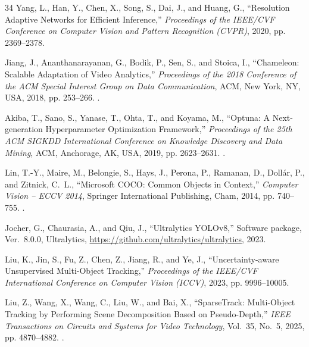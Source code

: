 \documentclass[journal]{new-aiaa}
\begin{document}
\begin{thebibliography}{34}
Yang, L., Han, Y., Chen, X., Song, S., Dai, J., and Huang, G.,
  \enquote{{Resolution Adaptive Networks for Efficient Inference},}
  \emph{Proceedings of the IEEE/CVF Conference on Computer Vision and Pattern
  Recognition (CVPR)}, 2020, pp. 2369--2378.

Jiang, J., Ananthanarayanan, G., Bodik, P., Sen, S., and Stoica, I.,
  \enquote{{Chameleon: Scalable Adaptation of Video Analytics},}
  \emph{Proceedings of the 2018 Conference of the ACM Special Interest Group on
  Data Communication}, ACM, New York, NY, USA, 2018, pp. 253--266.
\newblock {}.

Akiba, T., Sano, S., Yanase, T., Ohta, T., and Koyama, M., \enquote{{Optuna: A
  Next-generation Hyperparameter Optimization Framework},} \emph{Proceedings of
  the 25th ACM SIGKDD International Conference on Knowledge Discovery and Data
  Mining}, ACM, Anchorage, AK, USA, 2019, pp. 2623--2631.
\newblock {}.

Lin, T.-Y., Maire, M., Belongie, S., Hays, J., Perona, P., Ramanan, D.,
  Doll{\'a}r, P., and Zitnick, C.~L., \enquote{{Microsoft COCO: Common Objects
  in Context},} \emph{Computer Vision -- ECCV 2014}, Springer International
  Publishing, Cham, 2014, pp. 740--755.
\newblock {}.

Jocher, G., Chaurasia, A., and Qiu, J., \enquote{{Ultralytics YOLOv8},}
  Software package, Ver.~8.0.0, Ultralytics,
  \url{https://github.com/ultralytics/ultralytics}, 2023.

Liu, K., Jin, S., Fu, Z., Chen, Z., Jiang, R., and Ye, J.,
  \enquote{{Uncertainty-aware Unsupervised Multi-Object Tracking},}
  \emph{Proceedings of the IEEE/CVF International Conference on Computer Vision
  (ICCV)}, 2023, pp. 9996--10005.

Liu, Z., Wang, X., Wang, C., Liu, W., and Bai, X., \enquote{{SparseTrack:
  Multi-Object Tracking by Performing Scene Decomposition Based on
  Pseudo-Depth},} \emph{IEEE Transactions on Circuits and Systems for Video
  Technology}, Vol.~35, No.~5, 2025, pp. 4870--4882.
\newblock {}.

\end{thebibliography}
\end{document}
